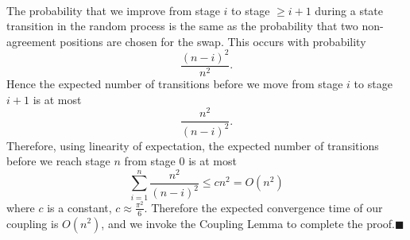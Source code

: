 \documentclass[letterpaper,12pt,oneside,onecolumn]{article}
\begin{document}
	\paragraph{}
	The probability that we improve from stage $i$ to stage $\geq i+1$ during a state transition in the random process is the same as the probability that two non-agreement positions are chosen for the swap. This occurs with probability
	$$\frac{(n-i)^2}{n^2}.$$
	Hence the expected number of transitions before we move from stage $i$ to stage $i+1$ is at most
	$$\frac{n^2}{(n-i)^2}.$$
	Therefore, using linearity of expectation, the expected number of transitions before we reach stage $n$ from stage $0$ is at most
	$$\sum_{i=1}^n\frac{n^2}{(n-i)^2} \leq cn^2 = O(n^2)$$
	where $c$ is a constant, $c \approx \frac{\pi^2}{6}$. Therefore the expected convergence time of our coupling is $O(n^2)$, and we invoke the Coupling Lemma to complete the proof.$\blacksquare$
\end{document}
